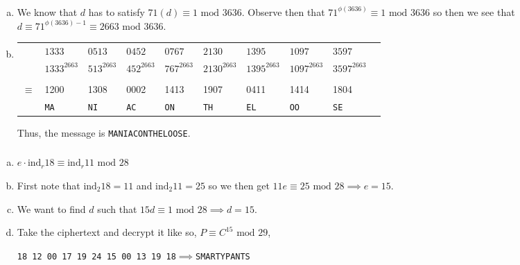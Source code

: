 \documentclass[class=article, crop=false]{standalone}
\def\ind{{\text{ind}}}
\begin{document}
\subsubsection{}
\begin{enumerate}[(a)]
  \item
    We know that $d$ has to satisfy $71(d) \equiv 1\mbox{ mod }3636$.
    Observe then that $71^{\phi(3636)}\equiv 1\mbox{ mod }3636$
    so then we see that $d\equiv 71^{\phi(3636)-1}\equiv2663\mbox{ mod }3636$.

  \item
    \begin{table}[htb!]
      \begin{center}
      \begin{tabular}{c l l l l l l l l l}
        $ $& $1333$& $0513$& $0452$& $0767$& $2130$& $1395$& $1097$& $3597$ \\
        $ $& $1333^{2663}$& $513^{2663}$& $452^{2663}$& $767^{2663}$& $2130^{2663}$& $1395^{2663}$& $1097^{2663}$& $3597^{2663}$ \\
        \hline \\
        $\equiv$& 1200& 1308& 0002& 1413& 1907& 0411& 1414& 1804\\
        $ $& \verb|MA|& \verb|NI|& \verb|AC|& \verb|ON|& \verb|TH|& \verb|EL|& \verb|OO|& \verb|SE|
      \end{tabular}
      \end{center}
    \end{table}
    Thus, the message is \verb|MANIACONTHELOOSE|.

\end{enumerate}
\subsubsection{}
\begin{enumerate}[(a)]
  \item 
  $e\cdot\ind_r 18 \equiv \ind_r 11\mbox{ mod }28$

  \item
    First note that $\ind_2 18 = 11$ and $\ind_2 11 = 25$ so we then get
    $11e\equiv 25\mbox{ mod }28 \implies e=15$. 

  \item
    We want to find $d$ such that $15d \equiv 1\mbox{ mod }28 \implies d=15$.

  \item
    Take the ciphertext and decrypt it like so, $P \equiv C^{15}\mbox{ mod }29$,
    \begin{center}
      \texttt{18 12 00 17 19 24 15 00 13 19 18}$\implies$\verb|SMARTYPANTS|
    \end{center}

  \end{enumerate}
\end{document}
